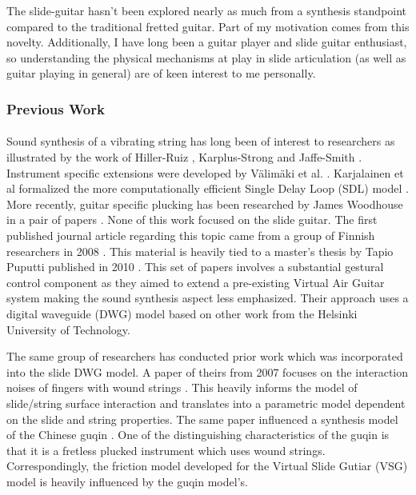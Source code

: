 \documentclass[12pt]{article}
\begin{document}
The slide-guitar hasn’t been explored nearly as much from a synthesis standpoint compared to the traditional fretted guitar. Part of my motivation comes from this novelty. Additionally, I have long been a guitar player and slide guitar enthusiast, so understanding the physical mechanisms at play in slide articulation (as well as guitar playing in general) are of keen interest to me personally.

\subsubsection*{Previous Work}
\paragraph{}
Sound synthesis of a vibrating string has long been of interest to researchers as illustrated by the work of Hiller-Ruiz \cite{hiller_synthesizing_1971} \cite{hiller_synthesizing_1971-1}, Karplus-Strong \cite{karplus_digital_1983} and Jaffe-Smith \cite{jaffe_extensions_1983}. Instrument specific extensions were developed by Välimäki et al. \cite{vaelimaeki_physical_1996}.  Karjalainen et al formalized the more computationally efficient Single Delay Loop (SDL) model \cite{karjalainen_plucked-string_1998}. More recently, guitar specific plucking has been researched by James Woodhouse in a pair of papers \cite{woodhouse_synthesis_2004} \cite{woodhouse_plucked_2004}. None of this work focused on the slide guitar. The first published journal article regarding this topic came from a group of Finnish researchers in 2008 \cite{pakarinen_virtual_2008}. This material is heavily tied to a master’s thesis by Tapio Puputti published in 2010 \cite{puputti_real-time_2012}. This set of papers involves a substantial gestural control component as they aimed to extend a pre-existing Virtual Air Guitar system making the sound synthesis aspect less emphasized. Their approach uses a digital waveguide (DWG) model based on other work from the Helsinki University of Technology.

The same group of researchers has conducted prior work which was incorporated into the slide DWG model. A paper of theirs from 2007 focuses on the interaction noises of fingers with wound strings \cite{pakarinen_analysis_2007}. This heavily informs the model of slide/string surface interaction and translates into a parametric model dependent on the slide and string properties. The same paper influenced a synthesis model of the Chinese guqin \cite{penttinen_model-based_2006}. One of the distinguishing characteristics of the guqin is that it is a fretless plucked instrument which uses wound strings. Correspondingly, the friction model developed for the Virtual Slide Gutiar (VSG) model is heavily influenced by the guqin model's.
\end{document}
